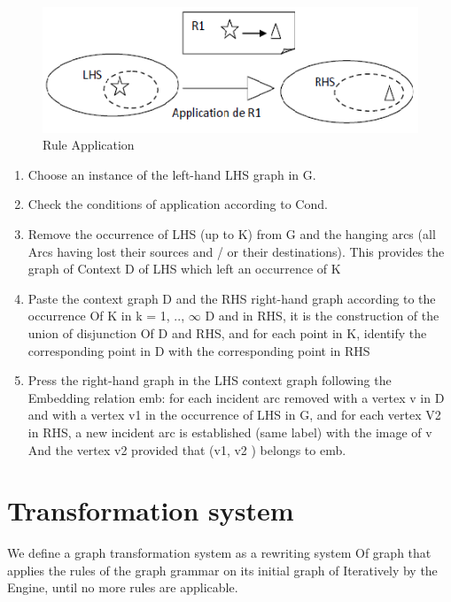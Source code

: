 \begin{figure}[th]
	\centering
		\includegraphics[scale=0.9]{ch3/img/rules}
	\caption{\label{fig:Rule Application}Rule Application\cite{ch3-img}}
\end{figure} 

\begin{enumerate}
\item Choose an instance of the left-hand LHS graph in G.
\item Check the conditions of application according to Cond.
\item Remove the occurrence of LHS (up to K) from G and the hanging arcs (all
Arcs having lost their sources and / or their destinations). This provides the graph of
Context D of LHS which left an occurrence of K
\item
Paste the context graph D and the RHS right-hand graph according to the occurrence
Of K in k = 1, .., $\infty$ D and in RHS, it is the construction of the union of disjunction
Of D and RHS, and for each point in K, identify the corresponding point in
D with the corresponding point in RHS
\item
Press the right-hand graph in the LHS context graph following the
Embedding relation emb: for each incident arc removed with a vertex v in
D and with a vertex v1 in the occurrence of LHS in G, and for each vertex
V2 in RHS, a new incident arc is established (same label) with the image of v
And the vertex v2 provided that (v1, v2 ) belongs to emb. 
\end{enumerate}


 
\section{Transformation system} 

We define a graph transformation system as a rewriting system
Of graph that applies the rules of the graph grammar on its initial graph of
Iteratively by the Engine, until no more rules are applicable\cite{ch3-doc2, ch3-doc}.

